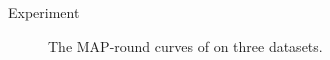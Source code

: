 \documentclass[final]{beamer}
\newlength{\colwidth}
\begin{document}
\begin{frame}[t]
\begin{columns}[t]
\begin{column}{\colwidth}
\begin{block}{Experiment}
\begin{figure}
{							\label{fig:CIFAR-10@64bits}} 
						\caption{The MAP-round curves of on three datasets.}
						\label{fig:map_round}
						\vspace{-6mm}
					\end{figure}
					

\end{block}
\end{column}
\end{columns}
\end{frame}
\end{document}
